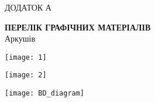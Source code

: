 \documentclass[main.tex]{subfiles}
\begin{document}
\renewcommand\stamppartname{Перелік графічних матеріалів}

\begin{specialpage}
  \MakeUppercase{Додаток А}\\
  \MakeUppercase{\stampname{}}

  \vspace*{\fill}
  \textbf{\MakeUppercase{\stamppartname{}}}\\
  Аркушів \pageref{\lastpagelabel{}}

  \vspace*{\fill}
  \mypagefooter{}
\end{specialpage}

\pagestyle{plain}

\renewcommand\stamppartname{Діаграма варіантів використання}
\begin{center}
\noindent\texttt{[image: 1]}
\end{center}

\renewcommand\stampcode{ІАЛЦ.467100.005.Д2}
\renewcommand\stamppartname{Схема програми}
\begin{center}
\noindent\texttt{[image: 2]}
\end{center}
% 
\renewcommand\stampcode{ІАЛЦ.467100.006.Д3}
\renewcommand\stamppartname{Схема даних}
\begin{center}
\noindent\texttt{[image: BD\_diagram]}
\end{center}

\finalizepart{}
\end{document}
